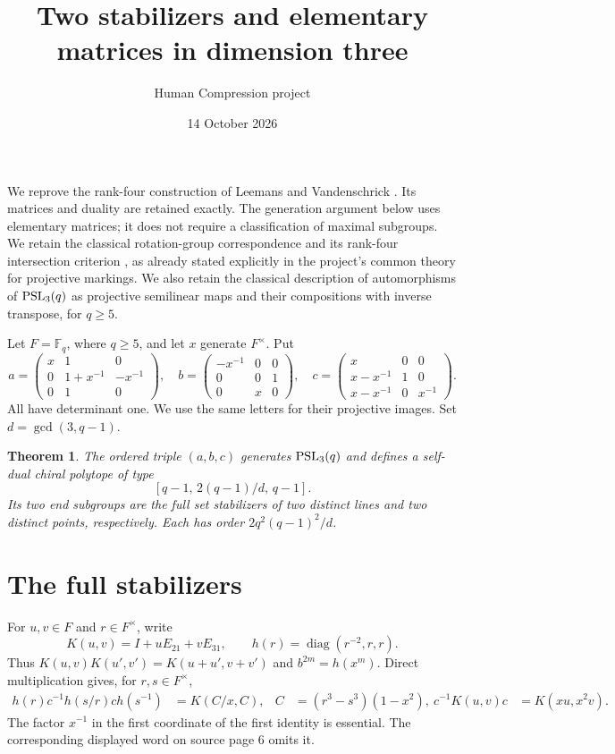\documentclass[11pt,a4paper]{article}
\title{Two stabilizers and elementary matrices in dimension three}
\author{Human Compression project}\date{14 October 2026}
\newtheorem{theorem}{Theorem}\newtheorem{lemma}[theorem]{Lemma}
\begin{document}
\maketitle
We reprove the rank-four construction of Leemans and Vandenschrick
\cite[Theorem 1.1]{source}. Its matrices and duality are retained exactly.
The generation argument below uses elementary matrices; it does not
require a classification of maximal subgroups. We retain the classical
rotation-group correspondence and its rank-four intersection criterion
\cite{SW}, as already stated explicitly in the project's common theory
for projective markings. We also retain the classical description of
automorphisms of $\operatorname{PSL}_3(q)$ as projective semilinear maps and their
compositions with inverse transpose, for $q\geq5$.

Let $F=\mathbb F_q$, where $q\geq5$, and let $x$ generate $F^\times$.
Put
\[
 a=\begin{pmatrix}x&1&0\\0&1+x^{-1}&-x^{-1}\\0&1&0\end{pmatrix},\quad
 b=\begin{pmatrix}-x^{-1}&0&0\\0&0&1\\0&x&0\end{pmatrix},\quad
 c=\begin{pmatrix}x&0&0\\x-x^{-1}&1&0\\x-x^{-1}&0&x^{-1}\end{pmatrix}.
\]
All have determinant one. We use the same letters for their projective
images. Set $d=\gcd(3,q-1)$.
\begin{theorem}
The ordered triple $(a,b,c)$ generates $\operatorname{PSL}_3(q)$ and defines a
self-dual chiral polytope of type
\[
             [q-1,\,2(q-1)/d,\,q-1].
\]
Its two end subgroups are the full set stabilizers of two distinct lines
and two distinct points, respectively. Each has order
$2q^2(q-1)^2/d$.
\end{theorem}

\section{The full stabilizers}
For $u,v\in F$ and $r\in F^\times$, write
\[
 K(u,v)=I+uE_{21}+vE_{31},\qquad h(r)=\operatorname{diag}(r^{-2},r,r).
\]
Thus $K(u,v)K(u',v')=K(u+u',v+v')$ and $b^{2m}=h(x^m)$.
Direct multiplication gives, for $r,s\in F^\times$,
\begin{align}
 h(r)c^{-1}h(s/r)c h(s^{-1})&=K(C/x,C),
       & C&=(r^3-s^3)(1-x^2),\
 c^{-1}K(u,v)c&=K(xu,x^2v). \label{eq:conjugation}
\end{align}
The factor $x^{-1}$ in the first coordinate of the first identity is
essential. The corresponding displayed word on source page 6 omits it.
\end{document}
